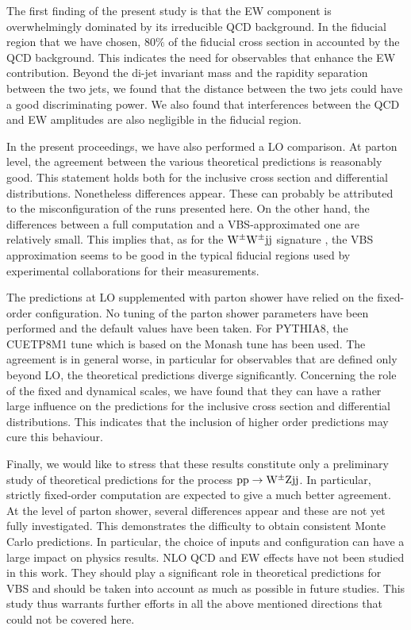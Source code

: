 \documentclass[11pt]{cernrep}
\begin{document}
The first finding of the present study is that the EW component is overwhelmingly dominated by its irreducible QCD background.
In the fiducial region that we have chosen, $80\%$ of the fiducial cross section in accounted by the QCD background.
This indicates the need for observables that enhance the EW contribution.
Beyond the di-jet invariant mass and the rapidity separation between the two jets, we found that the distance between the two jets could have a good discriminating power.
We also found that interferences between the QCD and EW amplitudes are also negligible in the fiducial region.

In the present proceedings, we have also performed a LO comparison.
At parton level, the agreement between the various theoretical predictions is reasonably good.
This statement holds both for the inclusive cross section and differential distributions.
Nonetheless differences appear.
These can probably be attributed to the misconfiguration of the runs presented here.
On the other hand, the differences between a full computation and a VBS-approximated one are relatively small.
This implies that, as for the ${\rm W}^\pm{\rm W}^\pm{\rm j}{\rm j}$ signature \cite{Anders:2018gfr}, the VBS approximation seems to be good in the typical fiducial regions used by experimental collaborations for their measurements.

The predictions at LO supplemented with parton shower have relied on the fixed-order configuration.
No tuning of the parton shower parameters have been performed and the default values have been taken.
For {\sc PYTHIA8}, the {\sc CUETP8M1} tune \cite{Khachatryan:2015pea} which is based on the Monash tune \cite{Skands:2014pea} has been used. 
The agreement is in general worse, in particular for observables that are defined only beyond LO, the theoretical predictions diverge significantly.
Concerning the role of the fixed and dynamical scales, we have found that they can have a rather large influence on the predictions for the inclusive cross section and differential distributions.
This indicates that the inclusion of higher order predictions may cure this behaviour.

Finally, we would like to stress that these results constitute only a preliminary study of theoretical predictions for the process ${\rm p}{\rm p} \to {\rm W}^{\pm}{\rm Z}{\rm j}{\rm j}$.
In particular, strictly fixed-order computation are expected to give a much better agreement.
At the level of parton shower, several differences appear and these are not yet fully investigated.
This demonstrates the difficulty to obtain consistent Monte Carlo predictions.
In particular, the choice of inputs and configuration can have a large impact on physics results.
NLO QCD and EW effects have not been studied in this work.
They should play a significant role in theoretical predictions for VBS and should be taken into account as much as possible in future studies.
This study thus warrants further efforts in all the above mentioned directions that could not be covered here.


\end{document}

